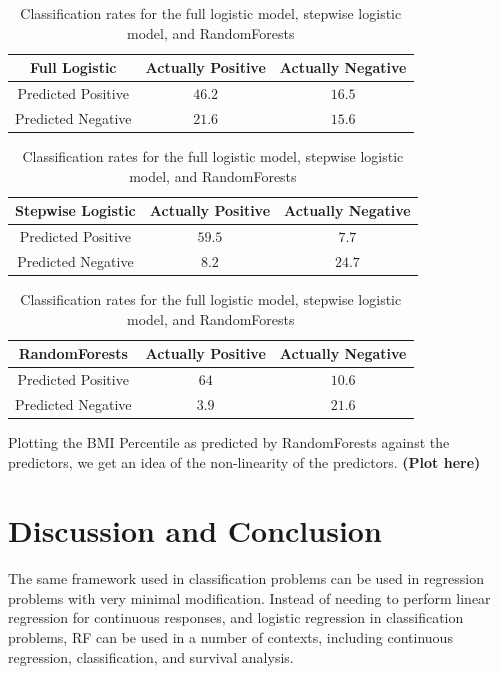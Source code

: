 \documentclass[11pt]{article}
\begin{document}
\begin{table}[H] \center
\caption{Classification rates for the full logistic model, stepwise logistic model, and RandomForests}
\begin{tabular}{|c|c|c|} \hline
\textbf{Full Logistic} & Actually Positive & Actually Negative \\ \hline
Predicted Positive & $46.2$ & $16.5$ \\ \hline
Predicted Negative & $21.6$ & $15.6$ \\ \hline
\end{tabular}

\begin{tabular}{|c|c|c|} \hline
\textbf{Stepwise Logistic} & Actually Positive & Actually Negative \\ \hline
Predicted Positive & $59.5$ & $7.7$ \\ \hline
Predicted Negative & $8.2$ & $24.7$ \\ \hline
\end{tabular}

\begin{tabular}{|c|c|c|} \hline
\textbf{RandomForests} & Actually Positive & Actually Negative \\ \hline
Predicted Positive & $64$ & $10.6$ \\ \hline
Predicted Negative & $3.9$ & $21.6$ \\ \hline
\end{tabular}
\end{table}

Plotting the BMI Percentile as predicted by RandomForests against the predictors, we get an idea of the non-linearity of the predictors.
\textbf{(Plot here)}

\section*{Discussion and Conclusion}
The same framework used in classification problems can be used in regression problems with very minimal modification. Instead of needing to perform linear regression for continuous responses, and logistic regression in classification problems, RF can be used in a number of contexts, including continuous regression, classification, and survival analysis.

\nocite{*}


\end{document}
